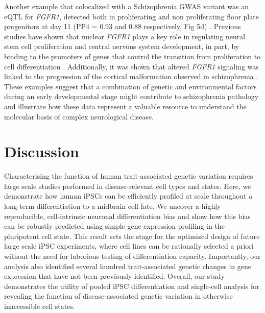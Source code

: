Another example that colocalized with a Schizophrenia GWAS variant was an eQTL for
\textit{FGFR1}, detected both in proliferating and non proliferating floor plate progenitors at day 11 (PP4 = 0.93 and 0.88 respectively, Fig 5d) . 
Previous studies have shown that nuclear \textit{FGFR1} plays a key role in regulating neural stem cell proliferation and central nervous system development, in part, by binding to the promoters of genes that control the transition from proliferation to cell differentiation \cite{ma2009molecular}. 
Additionally, it was shown that altered \textit{FGFR1} signaling was linked to the progression of the cortical malformation observed in schizophrenia \cite{stachowiak2017cerebral}.\\

These examples suggest that a combination of genetic and environmental factors during an early developmental stage might contribute to schizophrenia pathology and illustrate how these data represent a valuable resource to understand the molecular basis of complex neurological disease.

\newpage

\section{Discussion}




Characterising the function of human trait-associated genetic variation requires large scale studies performed in disease-relevant cell types and states. 
Here, we demonstrate how human iPSCs can be efficiently profiled at scale throughout a long-term differentiation to a midbrain cell fate. 
We uncover a highly reproducible, cell-intrinsic neuronal differentiation bias and show how this bias can be robustly predicted using simple gene expression profiling in the pluripotent cell state. 
This result sets the stage for the optimized design of future large scale iPSC experiments, where cell lines can be rationally selected a priori without the need for laborious testing of differentiation capacity. 
Importantly, our analysis also identified several hundred trait-associated genetic changes in gene expression that have not been previously identified. 
Overall, our study demonstrates the utility of pooled iPSC differentiation and single-cell analysis for revealing the function of disease-associated genetic variation in otherwise inaccessible cell states.\\

